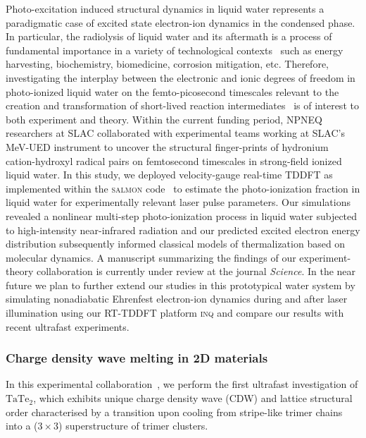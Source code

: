 Photo-excitation induced structural dynamics in liquid water represents a paradigmatic case of excited state electron-ion dynamics in the condensed phase. 
In particular, the radiolysis of liquid water and its aftermath is a process of fundamental importance in a variety of technological contexts~\cite{Garrett2005} such as energy harvesting, biochemistry, biomedicine, corrosion mitigation, etc. 
Therefore, investigating the interplay between the electronic and ionic degrees of freedom in photo-ionized liquid water on the femto-picosecond timescales relevant to the creation and transformation of short-lived reaction intermediates~\cite{Loh2020} is of interest to both experiment and theory.
Within the current funding period, NPNEQ researchers at SLAC collaborated with experimental teams working at SLAC's MeV-UED instrument to uncover the structural finger-prints of hydronium cation-hydroxyl radical pairs on femtosecond timescales in strong-field ionized liquid water. 
In this study, we deployed velocity-gauge real-time TDDFT as implemented within the \textsc{salmon} code~\cite{salmon} to estimate the photo-ionization fraction in liquid water for experimentally relevant laser pulse parameters. 
Our simulations revealed a nonlinear multi-step photo-ionization process in liquid water subjected to high-intensity near-infrared radiation and our predicted excited electron energy distribution subsequently informed classical models of thermalization based on molecular dynamics. 
A manuscript summarizing the findings of our experiment-theory collaboration is currently under review at the journal \emph{Science}.
In the near future we plan to further extend our studies in this prototypical water system by simulating nonadiabatic Ehrenfest electron-ion dynamics during and after laser illumination using our RT-TDDFT platform \textsc{inq} and compare our results with recent ultrafast experiments. 


\subsubsection{Charge density wave melting in 2D materials}

In this experimental collaboration~\cite{Siddiqui2020}, we perform the first ultrafast investigation of \(\mathrm{TaTe_2}\), which exhibits unique charge density wave (CDW) and lattice structural order characterised by a transition upon cooling from stripe-like trimer chains into a (\(3\times 3\)) superstructure of trimer clusters. 

